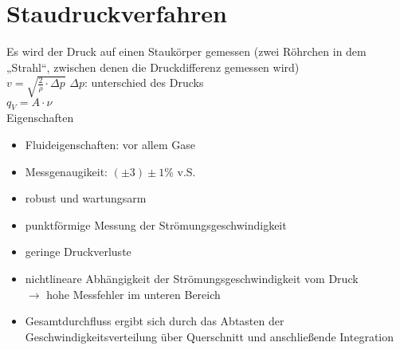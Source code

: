 \documentclass{scrreprt}
\begin{document}
\section{Staudruckverfahren}
Es wird der Druck auf einen Staukörper gemessen (zwei Röhrchen in dem „Strahl“, zwischen denen die Druckdifferenz gemessen wird)\\
$v=\sqrt{\frac{2}{\rho}\cdot \Delta p}$ \qquad $\Delta p$: unterschied des Drucks\\
$q_V = A \cdot \nu$\\
Eigenschaften
\begin{itemize}
\item Fluideigenschaften: vor allem Gase
\item Messgenaugikeit: $(\pm 3) \pm 1 \%$ v.S.
\end{itemize}
\begin{itemize}[label=$+$]
\item robust und wartungsarm
\item punktförmige Messung der Strömungsgeschwindigkeit
\item geringe Druckverluste
\end{itemize}

\begin{itemize}[label=$-$]
\item nichtlineare Abhängigkeit der Strömungsgeschwindigkeit vom Druck\\
$\to$ hohe Messfehler im unteren Bereich
\item Gesamtdurchfluss ergibt sich durch das Abtasten der Geschwindigkeitsverteilung über Querschnitt und anschließende Integration
\end{itemize}
\end{document}
